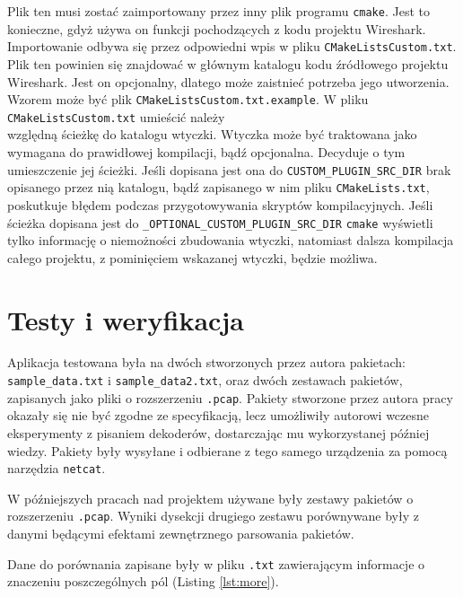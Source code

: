 \documentclass[a4paper, 11pt, twoside, openright]{article}
\begin{document}
	Plik ten musi zostać zaimportowany przez inny plik programu \texttt{cmake}. Jest to konieczne, gdyż używa on funkcji pochodzących z kodu projektu Wireshark.
	Importowanie odbywa się przez odpowiedni wpis w pliku \texttt{CMakeListsCustom.txt}. Plik ten powinien się znajdować w głównym katalogu kodu źródłowego
	projektu Wireshark. Jest on opcjonalny, dlatego może zaistnieć potrzeba jego utworzenia. Wzorem może być plik \texttt{CMakeListsCustom.txt.example}.
	W pliku \texttt{CMakeListsCustom.txt} umieścić należy \\ względną ścieżkę do katalogu wtyczki. Wtyczka może być traktowana jako wymagana do prawidłowej kompilacji, bądź opcjonalna.
	Decyduje o tym umieszczenie jej ścieżki. Jeśli dopisana jest ona do \texttt{CUSTOM\_PLUGIN\_SRC\_DIR} brak opisanego przez nią katalogu, bądź zapisanego w nim pliku \texttt{CMakeLists.txt},
	poskutkuje błędem podczas przygotowywania skryptów kompilacyjnych. Jeśli ścieżka dopisana jest do \texttt{\_OPTIONAL\_CUSTOM\_PLUGIN\_SRC\_DIR} \texttt{cmake}
	wyświetli tylko informację o niemożności zbudowania wtyczki, natomiast dalsza kompilacja całego projektu, z pominięciem wskazanej wtyczki, będzie możliwa.

\cleardoublepage
\section{Testy i weryfikacja}

	\indent\par
	Aplikacja testowana była na dwóch stworzonych przez autora pakietach: \\ \texttt{sample\_data.txt}
	i \texttt{sample\_data2.txt}, oraz dwóch zestawach pakietów, zapisanych jako pliki o rozszerzeniu \texttt{.pcap}.
	Pakiety stworzone przez autora pracy okazały się nie być zgodne ze specyfikacją, lecz umożliwiły autorowi
	wczesne eksperymenty z pisaniem dekoderów, dostarczając mu wykorzystanej później wiedzy. Pakiety były wysyłane
	i odbierane z tego samego urządzenia za pomocą narzędzia \texttt{netcat}.

	W późniejszych pracach nad projektem używane były zestawy pakietów o rozszerzeniu \texttt{.pcap}.
	Wyniki dysekcji drugiego zestawu porównywane były z danymi będącymi efektami zewnętrznego parsowania pakietów.

	Dane do porównania zapisane były w pliku \texttt{.txt} zawierającym informacje o znaczeniu poszczególnych pól (Listing \ref{lst:more}).
\end{document}
